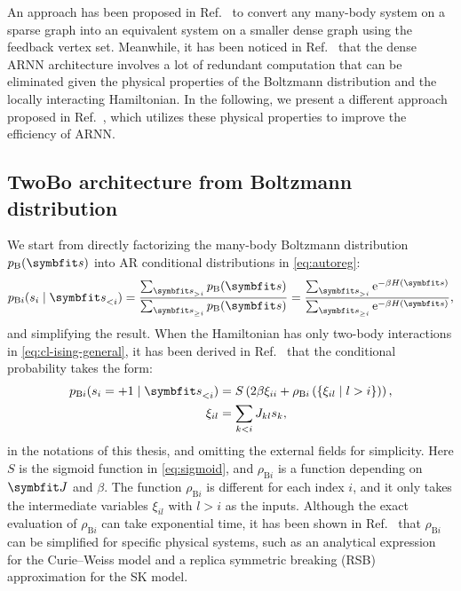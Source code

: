 An approach has been proposed in Ref.~\cite{pan2021solving} to convert any many-body system on a sparse graph into an equivalent system on a smaller dense graph using the feedback vertex set. Meanwhile, it has been noticed in Ref.~\cite{pr2021analysis} that the dense ARNN architecture involves a lot of redundant computation that can be eliminated given the physical properties of the Boltzmann distribution and the locally interacting Hamiltonian. In the following, we present a different approach proposed in Ref.~\cite{biazzo2024sparse}, which utilizes these physical properties to improve the efficiency of ARNN.

\subsection{TwoBo architecture from Boltzmann distribution}

We start from directly factorizing the many-body Boltzmann distribution $p_\text{B}(\vs)$ into AR conditional distributions in \cref{eq:autoreg}:
\begin{equation}
p_{\text{B} i}(s_i \mid \vs_{< i})
= \frac{\sum_{\vs_{> i}} p_\text{B}(\vs)}{\sum_{\vs_{\ge i}} p_\text{B}(\vs)}
= \frac{\sum_{\vs_{> i}} \rme^{-\beta H(\vs)}}{\sum_{\vs_{\ge i}} \rme^{-\beta H(\vs)}},
\end{equation}
and simplifying the result. When the Hamiltonian has only two-body interactions in \cref{eq:cl-ising-general}, it has been derived in Ref.~\cite{biazzo2024sparse} that the conditional probability takes the form:
\begin{align}
p_{\text{B} i}(s_i = +1 \mid \vs_{<i}) &= S\left( 2 \beta \xi_{i i} + \rho_{\text{B} i}\left( \{\xi_{i l} \mid l > i\} \right) \right), \label{eq:twobo} \\
\xi_{i l} &= \sum_{k < i} J_{k l} s_k, \label{eq:twobo-xi}
\end{align}
in the notations of this thesis, and omitting the external fields for simplicity. Here $S$ is the sigmoid function in \cref{eq:sigmoid}, and $\rho_{\text{B} i}$ is a function depending on $\mJ$ and $\beta$. The function $\rho_{\text{B} i}$ is different for each index $i$, and it only takes the intermediate variables $\xi_{i l}$ with $l > i$ as the inputs. Although the exact evaluation of $\rho_{\text{B} i}$ can take exponential time, it has been shown in Ref.~\cite{biazzo2023autoregressive} that $\rho_{\text{B} i}$ can be simplified for specific physical systems, such as an analytical expression for the Curie--Weiss model and a replica symmetric breaking (RSB) approximation for the SK model.


